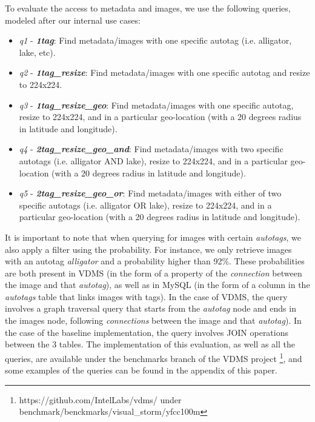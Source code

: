 To evaluate the access to metadata and images,
we use the following queries, modeled after our internal use cases:
\begin{itemize}
\item \textit{q1} - {\bf {\em 1tag}}: Find metadata/images with one specific autotag (i.e. alligator, lake, etc).
\item \textit{q2} - {\bf {\em 1tag\_resize}}: Find metadata/images with one specific autotag and resize to 224x224.
\item \textit{q3} - {\bf {\em 1tag\_resize\_geo}}: Find metadata/images with one specific autotag, resize to 224x224, and in a particular geo-location (with a 20 degrees radius in latitude and longitude).
\item \textit{q4} - {\bf {\em 2tag\_resize\_geo\_and}}: Find metadata/images with two specific autotags (i.e. alligator AND lake), resize to 224x224, and in a particular geo-location (with a 20 degrees radius in latitude and longitude).
\item \textit{q5} - {\bf {\em 2tag\_resize\_geo\_or}}: Find metadata/images with either of two specific autotags (i.e. alligator OR lake), resize to 224x224, and in a particular geo-location (with a 20 degrees radius in latitude and longitude).
\end{itemize}

It is important to note that when querying for images with certain
\textit{autotags}, we also apply a filter using the probability.
For instance, we only retrieve images with an autotag \textit{alligator}
and a probability higher than 92\%.
These probabilities are both present in VDMS (in the form of a property
of the \textit{connection} between the image and that \textit{autotag}),
as well as in MySQL (in the form of a column in the \textit{autotags} table
that links images with tags).
In the case of VDMS, the query involves a graph traversal query that starts
from the \textit{autotag} node and ends in the images node,
following \textit{connections} between the image and that \textit{autotag}).
In the case of the baseline implementation,
the query involves JOIN operations between the 3 tables.
The implementation of this evaluation, as well as all the queries, are available
under the benchmarks branch of the VDMS project
\footnote{https://github.com/IntelLabs/vdms/ under benchmark/benckmarks/visual\_storm/yfcc100m},
and some examples of the queries can be found in the appendix of this
paper.

